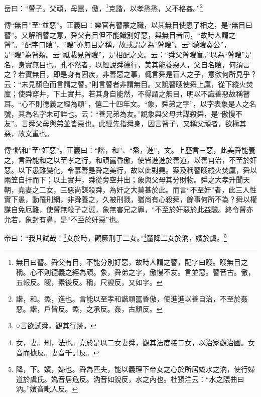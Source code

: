 岳曰：“瞽子。父頑，母嚚，傲，\footnote{無目曰瞽。舜父有目，不能分別好惡，故時人謂之瞽，配字曰瞍。瞍無目之稱。心不則德義之經為頑。象，舜弟之字，傲慢不友。言並惡。瞽音古。傲，五報反。瞍，素後反。稱，尺證反，又如字。}克諧，以孝烝烝，乂不格姦。”\footnote{諧，和。烝，進也。言能以至孝和諧頑嚚昏傲，使進進以善自治，不至於姦惡。諧，戶皆反。烝，之承反。姦，古顏反。}

{\noindent\zhuan{}\fzbyks 傳“無目”至“並惡”。正義曰：樂官有瞽蒙之職，以其無目使悤了相之，是“無目曰瞽”。又解稱瞽之意，舜父有目但不能識別好惡，與無目者同，“故時人謂之瞽”。“配字曰瞍”，“瞍”亦無目之稱，故或謂之為“瞽瞍”。云“矇瞍奏公”，是“瞍”為瞽類。云“祗載見瞽瞍”，是相配之文。云：“舜父瞽瞍盲。”以為“瞽瞍”是名，身實無目也。孔不然者，以經說舜德行，美其能養惡人，父自名瞍，何須言之？若實無目，即是身有固疾，非善惡之事，輒言舜是盲人之子，意欲何所見乎？云：“未見顏色而言謂之瞽。”則言瞽者非謂無目。又說瞽瞍使舜上廩，從下縱火焚廩；使舜穿井，下土實井。若其身自能然，不得謂之無目，明以不識善惡故稱瞽耳。“心不則德義之經為頑”，僖二十四年文。“象，舜弟之字”，以字表象是人之名號，其為名字未可詳也。云：“善兄弟為友。”說象與父母共謀殺舜，是“傲慢不友”。言舜父母與弟並皆惡也。此經先指舜身，因言瞽子，又稱父頑者，欲極其惡，故文重也。 \par}

{\noindent\zhuan{}\fzbyks 傳“諧和”至“奸惡”。正義曰：“諧，和”、“烝，進”，文。上歷言三惡，此美舜能養之，言舜能和之以至孝之行，和頑嚚昏傲，使皆進進於善道，以善自治，不至於奸惡。以下愚難變化，令慕善是舜之美行，故以此對堯。案及稱瞽瞍縱火焚廩，舜以兩笠自扞而下；以土實井，舜從旁空井出；象與父母其分財物。舜之大孝升聞天朝，堯妻之二女，三惡尚謀殺舜，為奸之大莫甚於此。而言“不至奸”者，此三人性實下愚，動罹刑網，非舜養之，久被刑戮，猶尚有心殺舜，餘事何所不為？舜以權謀自免厄難，使瞽無殺子之愆，象無害兄之罪，“不至於奸惡於此益驗。終令瞽亦允若，象封有鼻，是“不至於奸惡”也。 \par}

帝曰：“我其試哉！\footnote{○言欲試舜，觀其行跡。}女於時，觀厥刑于二女。”\footnote{女，妻。刑，法也。堯於是以二女妻舜，觀其法度接二女，以治家觀治國。女音而據反。妻音千計反。}釐降二女於汭，嬪於虞。\footnote{降，下。嬪，婦也。舜為匹夫，能以義理下帝女之心於所居媯水之汭，使行婦道於虞氏。媯音居危反。汭音如銳反，水之內也。杜預注云：“水之隈曲曰汭。”嬪音毗人反。}

